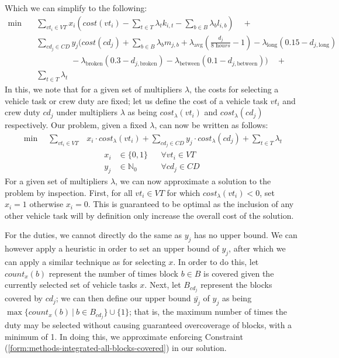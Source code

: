 \documentclass[]{article}
\begin{document}
Which we can simplify to the following:
\begin{align}
\min \quad & \sum_{vt_i \in VT} x_{i} (cost(vt_i) -\sum_{t \in T} \lambda_{t} k_{i,t} - \sum_{b \in B} \lambda_{b} l_{i,b})\quad+ \nonumber \\
& \sum_{cd_j \in CD} y_{j} (cost(cd_j) + \sum_{b \in B} \lambda_{b} m_{j,b} + \lambda_{\text{avg}} (\frac{d_{j}}{\textit{8 hours}} - 1) - \lambda_{\text{long}} (0.15 - d_{j,\text{long}}) \nonumber \\
&\quad\quad\quad\quad\:-\lambda_{\text{broken}} (0.3 - d_{j,\text{broken}}) - \lambda_{\text{between}} (0.1 - d_{j,\text{between}})) \quad + \nonumber \\
& \sum_{t \in T} \lambda_{t} \nonumber
\end{align}
In this, we note that for a given set of multipliers $\lambda$, the costs for selecting a vehicle task or crew duty are fixed; let us define the cost of a vehicle task $vt_i$ and crew duty $cd_j$ under multipliers $\lambda$ as being $cost_\lambda(vt_i)$ and $cost_\lambda(cd_j)$ respectively. Our problem, given a fixed $\lambda$, can now be written as follows:
\begin{align}
\min \quad \sum_{vt_i \in VT}& x_{i} \cdot cost_\lambda(vt_i) + \sum_{cd_j \in CD} y_{j} \cdot cost_\lambda(cd_j) + \sum_{t \in T} \lambda_{t}
\end{align}
\begin{align}
x_{i} &\in \{ 0, 1 \} && \forall vt_i \in VT \\
 y_{j} &\in \mathbb{N}_0 && \forall cd_j \in CD
\end{align}
For a given set of multipliers $\lambda$, we can now approximate a solution to the problem by inspection. First, for all $vt_i \in VT$ for which $cost_\lambda(vt_i) < 0$, set $x_i = 1$ otherwise $x_i = 0$. This is guaranteed to be optimal as the inclusion of any other vehicle task will by definition only increase the overall cost of the solution. 

For the duties, we cannot directly do the same as $y_j$ has no upper bound. We can however apply a heuristic in order to set an upper bound of $y_j$, after which we can apply a similar technique as for selecting $x$. In order to do this, let $\textit{count}_x(b)$ represent the number of times block $b \in B$ is covered given the currently selected set of vehicle tasks $x$. Next, let $B_{cd_j}$ represent the blocks covered by $cd_j$; we can then define our upper bound $\bar{y_{j}}$ of $y_j$ as being $\max \{ \textit{count}_x(b)\:|\:b \in B_{cd_j} \} \cup \{ 1 \}$; that is, the maximum number of times the duty may be selected without causing guaranteed overcoverage of blocks, with a minimum of 1. In doing this, we approximate enforcing Constraint (\ref{form:methods-integrated-all-blocks-covered}) in our solution.
\end{document}
